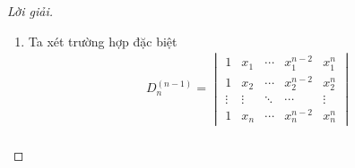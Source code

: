 \begin{proof}[Lời giải]
\begin{enumerate}[label = (\alph*)]
\begin{align*}
                              & = x_{n}\prod^{n-1}_{i=1}(x_{n} - x_{i}) \cdot D^{(1)}_{n-1} + \prod^{n-1}_{i=1}x_{i} \cdot D_{n}                                                                                                   \\
                              & = x_{n}\prod^{n-1}_{i=1}(x_{n} - x_{i}) \cdot \left(x_{n-1}\prod^{n-2}_{i=1}(x_{n-1} - x_{i})\cdot D^{(1)}_{n-2} + \prod^{n-2}_{i=1}x_{i}\cdot D_{n-1}\right) + \prod^{n-1}_{i=1}x_{i} \cdot D_{n} \\
                              & = x_{n}x_{n-1}\prod^{n-1}_{i=1}(x_{n} - x_{i})\prod^{n-2}_{i=1}(x_{n-1} - x_{i})\cdot D^{(1)}_{n-2} + \prod^{n}_{1\le i\ne n-1}x_{i}\cdot D_{n} + \prod^{n}_{1\le i\ne n}x_{i}\cdot D_{n}          \\
                              & = \cdots                                                                                                                                                                                           \\
                              & = D_{n}x_{1}x_{2}\cdots x_{n}\sum^{n}_{i=1}\frac{1}{x_{i}}                                                                                                                                         \\
                              & = D_{n}\sum^{n}_{i=1}\left(\prod^{n}_{1\le j\ne i}x_{j}\right)                                                                                                                                     \\
                              & = D_{n}e_{n-1}(x_{1},\ldots, x_{n}).
              \end{align*}
              \endgroup{}
        \item
              Ta xét trường hợp đặc biệt
              \begin{align*}
                   & D^{(n-1)}_{n} =
                  \begin{vmatrix}
                      1      & x_{1}  & \cdots & x_{1}^{n-2} & x_{1}^{n} \\
                      1      & x_{2}  & \cdots & x_{2}^{n-2} & x_{2}^{n} \\
                      \vdots & \vdots & \ddots & \cdots      & \vdots    \\
                      1      & x_{n}  & \cdots & x_{n}^{n-2} & x_{n}^{n}
                  \end{vmatrix}                                                                                                                                                                                 \\

\end{align*}
\end{enumerate}
\end{proof}
